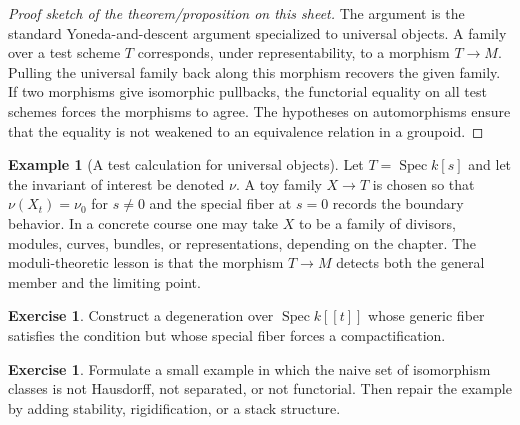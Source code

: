 \documentclass[11pt]{amsart}
\theoremstyle{definition}
\newtheorem{example}[theorem]{Example}
\newtheorem{exercise}[theorem]{Exercise}
\newcommand{\Spec}{\operatorname{Spec}}
\begin{document}
\begin{proof}[Proof sketch of the theorem/proposition on this sheet]
The argument is the standard Yoneda-and-descent argument specialized to universal objects.  A family over a test scheme $T$ corresponds, under representability, to a morphism $T\to M$.  Pulling the universal family back along this morphism recovers the given family.  If two morphisms give isomorphic pullbacks, the functorial equality on all test schemes forces the morphisms to agree.  The hypotheses on automorphisms ensure that the equality is not weakened to an equivalence relation in a groupoid.
\end{proof}
\begin{example}[A test calculation for universal objects]
Let $T=\Spec k[s]$ and let the invariant of interest be denoted $\nu$.  A toy family $X\to T$ is chosen so that $\nu(X_t)=\nu_0$ for $s\ne0$ and the special fiber at $s=0$ records the boundary behavior.  In a concrete course one may take $X$ to be a family of divisors, modules, curves, bundles, or representations, depending on the chapter.  The moduli-theoretic lesson is that the morphism $T\to M$ detects both the general member and the limiting point.
\end{example}
\begin{exercise}
Construct a degeneration over $\Spec k[[t]]$ whose generic fiber satisfies the condition but whose special fiber forces a compactification.
\end{exercise}
\begin{exercise}
Formulate a small example in which the naive set of isomorphism classes is not Hausdorff, not separated, or not functorial.  Then repair the example by adding stability, rigidification, or a stack structure.
\end{exercise}
\clearpage
\end{document}
